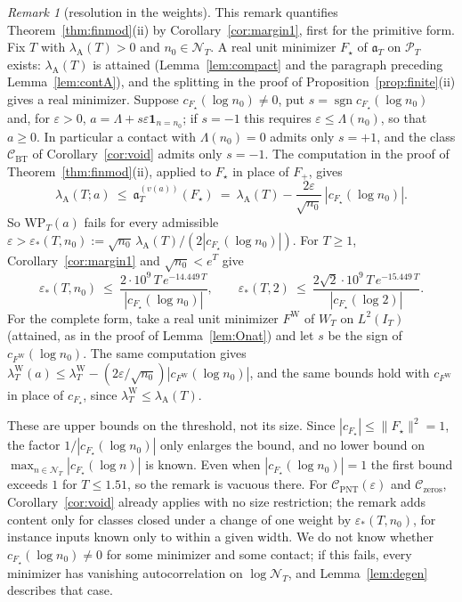\documentclass[11pt]{amsart}
\theoremstyle{definition}
\theoremstyle{remark}
\newtheorem{remark}[theorem]{Remark}
\newcommand{\PT}{\mathcal P_T}
\newcommand{\IT}{I_T}
\newcommand{\lamW}{\lambda^{\mathrm W}_T}
\newcommand{\lamA}{\lambda_{\mathrm A}(T)}
\newcommand{\NT}{\mathcal N_T}
\begin{document}
\begin{remark}[resolution in the weights]\label{rem:resweights}
This remark quantifies Theorem~\ref{thm:finmod}(ii) by Corollary~\ref{cor:margin1}, first for the
primitive form. Fix $T$ with $\lamA>0$ and $n_0\in\NT$. A real unit minimizer $F_\star$ of $\mathfrak a_T$ on
$\PT$ exists: $\lamA$ is attained (Lemma~\ref{lem:compact} and the paragraph preceding
Lemma~\ref{lem:contA}), and the splitting in the proof of Proposition~\ref{prop:finite}(ii) gives a real
minimizer. Suppose $c_{F_\star}(\log n_0)\ne0$, put $s=\operatorname{sgn}c_{F_\star}(\log n_0)$ and, for
$\varepsilon>0$, $a=\Lambda+s\varepsilon\mathbf 1_{n=n_0}$; if $s=-1$ this requires $\varepsilon\le\Lambda(n_0)$, so
that $a\ge0$. In particular a contact with $\Lambda(n_0)=0$ admits only $s=+1$, and the class
$\mathcal C_{\mathrm{BT}}$ of Corollary~\ref{cor:void} admits only $s=-1$. The computation in the proof of
Theorem~\ref{thm:finmod}(ii), applied to $F_\star$ in place of $F_+$, gives
\[
\lambda_{\mathrm A}(T;a)\ \le\ \mathfrak a^{(v(a))}_T(F_\star)\ =\ \lamA-\frac{2\varepsilon}{\sqrt{n_0}}\,|c_{F_\star}(\log n_0)| .
\]
So $\mathrm{WP}_T(a)$ fails for every admissible $\varepsilon>\varepsilon_*(T,n_0):=\sqrt{n_0}\,\lamA/(2|c_{F_\star}(\log n_0)|)$.
For $T\ge1$, Corollary~\ref{cor:margin1} and $\sqrt{n_0}<e^T$ give
\[
\varepsilon_*(T,n_0)\ \le\ \frac{2\cdot10^9\,T\,e^{-14.449\,T}}{|c_{F_\star}(\log n_0)|},\qquad
\varepsilon_*(T,2)\ \le\ \frac{2\sqrt2\cdot10^9\,T\,e^{-15.449\,T}}{|c_{F_\star}(\log2)|}.
\]
For the complete form, take a real unit minimizer $F^{\mathrm W}$ of $W_T$ on $L^2(\IT)$ (attained, as in the
proof of Lemma~\ref{lem:Onat}) and let $s$ be the sign of $c_{F^{\mathrm W}}(\log n_0)$. The same computation gives
$\lambda^{\mathrm W}_T(a)\le\lamW-(2\varepsilon/\sqrt{n_0})|c_{F^{\mathrm W}}(\log n_0)|$, and the same bounds hold with
$c_{F^{\mathrm W}}$ in place of $c_{F_\star}$, since $\lamW\le\lamA$.

These are upper bounds on the threshold, not its size. Since $|c_{F_\star}|\le\|F_\star\|^2=1$, the factor
$1/|c_{F_\star}(\log n_0)|$ only enlarges the bound, and no lower bound on $\max_{n\in\NT}|c_{F_\star}(\log n)|$ is
known. Even when $|c_{F_\star}(\log n_0)|=1$ the first bound exceeds $1$ for $T\le1.51$, so the remark is vacuous
there. For $\mathcal C_{\mathrm{PNT}}(\varepsilon)$ and $\mathcal C_{\mathrm{zeros}}$, Corollary~\ref{cor:void} already
applies with no size restriction; the remark adds content only for classes closed under a change of one
weight by $\varepsilon_*(T,n_0)$, for instance inputs known only to within a given width. We do not know whether
$c_{F_\star}(\log n_0)\ne0$ for some minimizer and some contact; if this fails, every minimizer has vanishing
autocorrelation on $\log\NT$, and Lemma~\ref{lem:degen} describes that case.
\end{remark}
\end{document}
